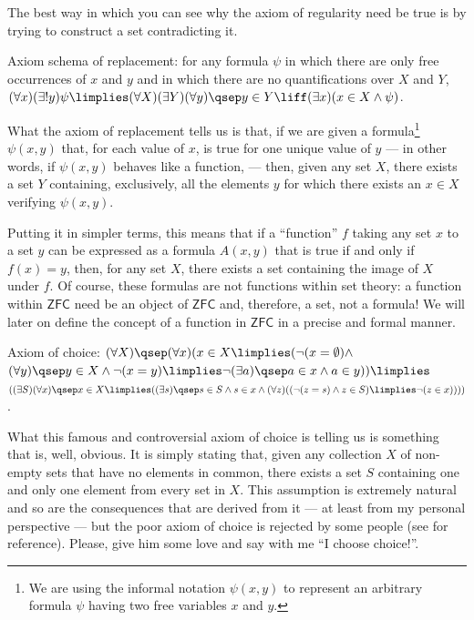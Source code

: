 \begin{para}
The best way in which you can see why the axiom of regularity need be true is by trying to construct a set contradicting it.

\begin{axioms}
\item \label{replacement} Axiom schema of replacement:
for any formula $\psi$ in which there are only free occurrences of $x$ and $y$ and in which there are no quantifications over $X$ and $Y$,
$(\forall x)(\exists! y) \psi \limplies (\forall X)(\exists Y)(\forall y)\qsep y\in Y \liff (\exists x)(x\in X \land \psi)$.
\end{axioms}
What the axiom of replacement tells us is that, if we are given a formula\footnote{We are using the informal notation $\psi(x,y)$ to represent an arbitrary formula $\psi$ having two free variables $x$ and $y$.} $\psi(x,y)$ that, for each value of $x$, is true for one unique value of $y$ --- in other words, if $\psi(x,y)$ behaves like a function, --- then, given any set $X$, there exists a set $Y$ containing, exclusively, all the elements $y$ for which there exists an $x\in X$ verifying $\psi(x,y)$.

Putting it in simpler terms, this means that if a ``function'' $f$ taking any set $x$ to a set $y$ can be expressed as a formula $A(x,y)$ that is true if and only if $f(x) = y$, then, for any set $X$, there exists a set containing the image of $X$ under $f$.
Of course, these formulas are not functions within set theory: a function within $\mathsf{ZFC}$ need be an object of $\mathsf{ZFC}$ and, therefore, a set, not a formula!
We will later on define the concept of a function in $\mathsf{ZFC}$ in a precise and formal manner. 

\begin{axioms}
\item \label{choice} Axiom of choice: $(\forall X) \qsep (\forall x)(x\in X \limplies (\lnot(x = \emptyset) \land$\\
\hspace*{1em}$(\forall y)\qsep y \in X \land\lnot(x = y) \limplies \lnot(\exists a)\qsep a \in x \land a \in y))\limplies$\\
$((\exists S)(\forall x)\qsep x\in X \limplies ((\exists s)\qsep s\in S \land s \in x \land(\forall z)((\lnot (z=s)\land z\in S )\limplies \lnot (z \in x))))$.
\end{axioms}
What this famous and controversial axiom of choice is telling us is something that is, well, obvious.
It is simply stating that, given any collection $X$ of non-empty sets that have no elements in common, there exists a set $S$ containing one and only one element from every set in $X$.
This assumption is extremely natural and so are the consequences that are derived from it --- at least from my personal perspective --- but the poor axiom of choice is rejected by some people (see \cite{Brown} for reference).
Please, give him some love and say with me ``I choose choice!''.


\end{para}
